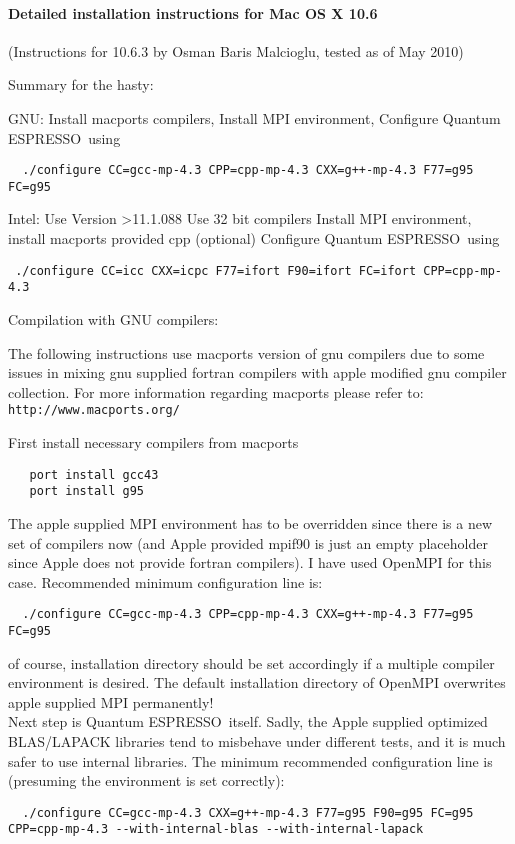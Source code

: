 \documentclass[12pt,a4paper]{article}
\def\qe{{\sc Quantum ESPRESSO}}
\begin{document}
\paragraph{Detailed installation instructions for Mac OS X 10.6}

(Instructions for 10.6.3 by Osman Baris Malcioglu, tested as of May 2010)

Summary for the hasty: 

GNU:
Install macports compilers, 
Install MPI environment,
Configure \qe\  using
\begin{verbatim}
  ./configure CC=gcc-mp-4.3 CPP=cpp-mp-4.3 CXX=g++-mp-4.3 F77=g95 FC=g95
\end{verbatim}

Intel:
Use Version >11.1.088
Use 32 bit compilers
Install MPI environment,
install macports provided cpp (optional)
Configure \qe\ using
\begin{verbatim}
 ./configure CC=icc CXX=icpc F77=ifort F90=ifort FC=ifort CPP=cpp-mp-4.3
\end{verbatim}

Compilation with GNU compilers:

The following instructions use macports version of gnu compilers due to some
issues in mixing gnu supplied fortran compilers with apple modified gnu compiler
collection. For more information regarding macports please refer to:
\texttt{http://www.macports.org/}  

First install necessary compilers from macports
\begin{verbatim}
   port install gcc43
   port install g95
\end{verbatim}
The apple supplied MPI environment has to be overridden since there is
a new set of compilers now (and Apple provided mpif90 is just an empty 
placeholder since Apple does not provide fortran compilers). I have used
OpenMPI for this case. Recommended minimum configuration line is:
\begin{verbatim}
  ./configure CC=gcc-mp-4.3 CPP=cpp-mp-4.3 CXX=g++-mp-4.3 F77=g95 FC=g95
\end{verbatim}
of course, installation directory should be set accordingly if a multiple
compiler environment is desired. The default installation directory of 
OpenMPI overwrites apple supplied MPI permanently!\\
Next step is \qe\ itself. Sadly, the Apple supplied optimized BLAS/LAPACK
libraries tend to misbehave under different tests, and it is much safer to
use internal libraries. The minimum recommended configuration
line is (presuming the environment is set correctly):
\begin{verbatim}
  ./configure CC=gcc-mp-4.3 CXX=g++-mp-4.3 F77=g95 F90=g95 FC=g95 CPP=cpp-mp-4.3 --with-internal-blas --with-internal-lapack
\end{verbatim}
\end{document}
